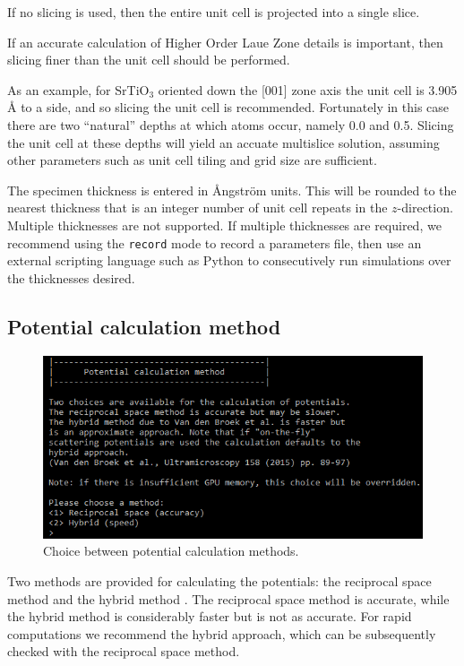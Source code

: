 \documentclass[12pt,a4paper]{article}
\begin{document}
If no slicing is used, then the entire unit cell is projected into a single slice.

If an accurate calculation of Higher Order Laue Zone details is important, then slicing finer than the unit cell should be performed.

As an example, for SrTiO$_3$ oriented down the [001] zone axis the unit cell is 3.905 \AA{} to a side, and so slicing the unit cell is recommended.
Fortunately in this case there are two ``natural'' depths at which atoms occur, namely 0.0 and 0.5.
Slicing the unit cell at these depths will yield an accuate multislice solution, assuming other parameters such as unit cell tiling and grid size are sufficient.

The specimen thickness is entered in \AA{}ngstr\"om units.
This will be rounded to the nearest thickness that is an integer number of unit cell repeats in the $z$-direction.
Multiple thicknesses are not supported.
If multiple thicknesses are required, we recommend using the \verb|record| mode to record a parameters file, then use an external scripting language such as Python to consecutively run simulations over the thicknesses desired.


\subsection{Potential calculation method}
\label{sec:pot_calc}

\begin{figure}[!h]
\begin{center}
    \includegraphics[scale=0.75]{potential_method.png}
\caption{Choice between potential calculation methods.}
\label{fig:potential_method}
\end{center}
\end{figure}

Two methods are provided for calculating the potentials: the reciprocal space method and the hybrid method \cite{VDB}.
The reciprocal space method is accurate, while the hybrid method is considerably faster but is not as accurate.
For rapid computations we recommend the hybrid approach, which can be subsequently checked with the reciprocal space method.
\end{document}
